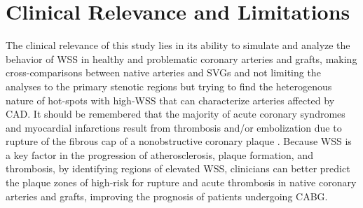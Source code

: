 ﻿\documentclass[12pt,a4paper]{article}
\theoremstyle{definition}
\numberwithin{equation}{section}
\begin{document}
\section{\label{Clinical Relevance and Limitations}Clinical Relevance and Limitations} 
\hspace*{\parindent}The clinical relevance of this study lies in its ability to simulate and analyze the behavior of WSS in healthy and problematic coronary arteries and grafts, making cross-comparisons between native arteries and SVGs and not limiting the analyses to the primary stenotic regions but trying to find the heterogenous nature of hot-spots with high-WSS that can characterize arteries affected by CAD. It should be remembered that the majority of acute coronary syndromes and myocardial infarctions result from thrombosis and/or embolization due to rupture of the fibrous cap of a nonobstructive coronary plaque \cite{43}. Because WSS is a key factor in the progression of atherosclerosis, plaque formation, and thrombosis, by identifying regions of elevated WSS, clinicians can better predict the plaque zones of high-risk for rupture and acute thrombosis in native coronary arteries and grafts, improving the prognosis of patients undergoing CABG. 
\end{document}
